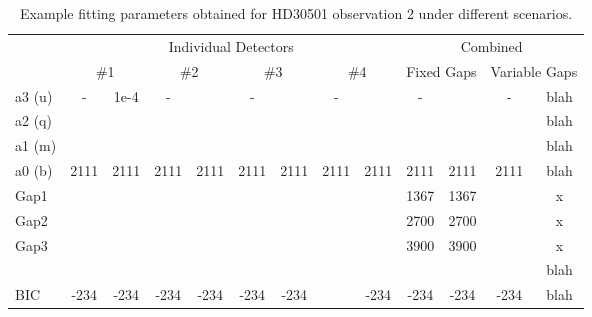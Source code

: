 \begin{table}
    \small
    \caption{Example fitting parameters obtained for HD30501 observation 2 under different scenarios.}
    \begin{tabular}{|l|c|c|c|c|c|c|c|c|c|c|c|c|}
    	\toprule
    	~    &    \multicolumn{8}{c|}{Individual Detectors}    &    \multicolumn{4}{c|}{Combined}    \\
    	~    & \multicolumn{2}{c|}{\#1} & \multicolumn{2}{c|}{\#2} & \multicolumn{2}{c|}{\#3} & \multicolumn{2}{c|}{\#4} & \multicolumn{2}{c|}{Fixed Gaps} & \multicolumn{2}{c|}{Variable Gaps} \\ \midrule
    	a3 (u)    &  -   &    1e-4    &  -   &    &  -   &    &  -   &    &  -   &    &  -   &    blah    \\
    	a2 (q)    &      &    &    &    &    &    &    &    &    &    &    &    blah    \\
    	a1 (m)   &      &    &    &    &    &    &    &    &    &    &    &    blah    \\
    	a0 (b)    & 2111 &    2111    & 2111 &    2111    & 2111 &    2111    & 2111 &    2111    & 2111 &    2111    & 2111 & blah \\
        Gap1 &      &    &    &    &    &    &    &    &   1367  & 1367   &   & x\\
        Gap2 &      &    &    &    &    &    &    &    &  2700   &  2700  &   & x\\
        Gap3 &      &    &    &    &    &    &    &    &   3900 &   3900 &    & x\\
    	\textchisquared{} &    &    &    &    &    &    &    &    &    &    &    &    blah    \\
    	BIC        & -234      &    -234    & -234 &    -234    & -234 &    -234    &    &    -234    & -234 &    -234    & -234 &    blah  \\
        \bottomrule
    \end{tabular}\label{tab:example_calibration_parametres}
\end{table}


